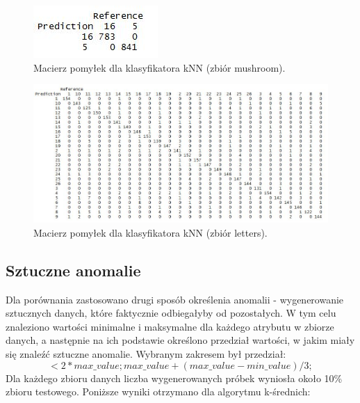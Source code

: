 \documentclass[11pt,a4paper,twoside]{article}
\begin{document}
\begin{figure}[H]
\centering
\includegraphics[scale=0.9]{confMatrixKnn_mushroom.JPG}
\caption{Macierz pomyłek dla klasyfikatora kNN (zbiór mushroom).}
\label{confMatrixJ48}
\end{figure}

\begin{figure}[H]
\centering
\includegraphics[scale=0.6]{confMatrixKnn_letters.JPG}
\caption{Macierz pomyłek dla klasyfikatora kNN (zbiór letters).}
\label{confMatrixJ48}
\end{figure}



\subsection {Sztuczne anomalie}

Dla porównania zastosowano drugi sposób określenia anomalii - wygenerowanie sztucznych danych, które faktycznie odbiegałyby od pozostałych. W tym celu znaleziono wartości minimalne i maksymalne dla każdego atrybutu w zbiorze danych, a następnie na ich podstawie określono przedział wartości, w jakim miały się znaleźć sztuczne anomalie. Wybranym zakresem był przedział: 
$$ <2*max\_value; max\_value + (max\_value - min\_value)/3 ;$$
Dla każdego zbioru danych liczba wygenerowanych próbek wyniosła około 10\% zbioru testowego. Poniższe wyniki otrzymano dla algorytmu k-średnich:
\end{document}
